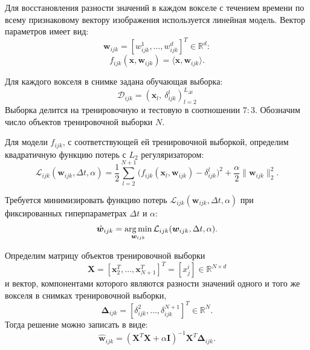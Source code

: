 \documentclass[12pt,twoside]{article}
\begin{document}
Для восстановления разности значений в каждом вокселе с течением времени по всему признаковому вектору изображения используется линейная модель. Вектор параметров имеет вид:
\[ \bm{w}_{ijk} = [w_{ijk}^1, \ldots, w_{ijk}^{d}]^{T} \in \mathbb{R}^{d}: \]
\begin{equation}
	\label{f_ijk}
	f_{ijk}(\bm{x}, \bm{w}_{ijk}) = \langle \bm{x}, \bm{w}_{ijk} \rangle.
\end{equation}

Для каждого вокселя в снимке задана обучающая выборка:
\begin{equation}
    \mathcal{D}_{ijk} = \left(\bm{x}_l,~\delta^{l}_{ijk} \right)^{ L_{\Delta t}}_{l = 2}
\end{equation}
Выборка делится на тренировочную и тестовую в соотношении $7 : 3$. 
Обозначим число объектов тренировочной выборки $N$.

Для модели $f_{ijk}$, с соответствующей ей тренировочной выборкой,
определим квадратичную функцию потерь с $L_2$ регуляризатором:
\begin{equation}
	\label{Loss}
	\mathcal{L}_{ijk}(\bm{w}_{ijk}, \Delta t, \alpha) = \frac{1}{2} \sum\limits_{l = 2}^{N+1} \big(f_{ijk}(\bm{x}_l, \bm{w}_{ijk}) - \delta^{l}_{ijk}\big)^2 + \frac{\alpha}{2} \|\bm{w}_{ijk}\|^2_2.
\end{equation}

Требуется минимизировать функцию потерь $\mathcal{L}_{ijk}(\bm{w}_{ijk}, \Delta t, \alpha)$ при фиксированных гиперпараметрах $\Delta t$ и $\alpha$:
\begin{equation}
	\label{main_Problem}
	\hat{\bm{w}}_{ijk} = \argmin_{\bm{w}_{ijk}} \mathcal{L}_{ijk}(\bm{w}_{ijk}, \Delta t, \alpha).
\end{equation}

Определим матрицу объектов тренировочной выборки
\begin{equation}
\label{X}
    \bm{X} = [\bm{x}_2^T, \dots, \bm{x}_{N+1}^T]^T = [x^i_j] \in \mathbb{R}^{N \times d}
\end{equation}
и вектор, компонентами которого являются разности значений одного и того же вокселя в снимках тренировочной выборки,
\begin{equation}
\label{Delta}
    \bm{\Delta}_{ijk} = [\delta^{2}_{ijk}, \dots, \delta^{N+1}_{ijk}]^T \in \mathbb{R}^{N}.
\end{equation}
Тогда решение можно записать в виде:
\begin{equation}
\label{weights}
    \hat{\bm{w}}_{ijk} = (\bm{X}^T \bm{X} + \alpha \mathbf{I})^{-1} \bm{X}^T \mathbf{\Delta}_{ijk}.
\end{equation}
\end{document}
